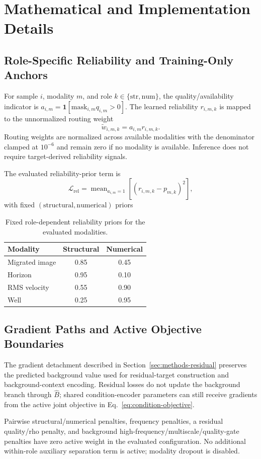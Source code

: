 \section{Mathematical and Implementation Details}
\label{app:math}
\setcounter{equation}{0}
\setcounter{table}{0}
\setcounter{figure}{0}

\subsection{Role-Specific Reliability and Training-Only Anchors}

For sample $i$, modality $m$, and role $k\in\{\mathrm{str},\mathrm{num}\}$, the quality/availability indicator is $a_{i,m}=\mathbf{1}[\mathrm{mask}_{i,m}q_{i,m}>0]$. The learned reliability $r_{i,m,k}$ is mapped to the unnormalized routing weight
\begin{equation}
\widetilde w_{i,m,k}=a_{i,m}r_{i,m,k}.
\label{eq:appendix-reliability-weight}
\end{equation}
Routing weights are normalized across available modalities with the denominator clamped at $10^{-6}$ and remain zero if no modality is available. Inference does not require target-derived reliability signals.

The evaluated reliability-prior term is
\begin{equation}
\mathcal L_{\mathrm{rel}}
=
\operatorname{mean}_{a_{i,m}=1}
\left[
(r_{i,m,k}-p_{m,k})^2
\right],
\end{equation}
with fixed $(\mathrm{structural},\mathrm{numerical})$ priors
\begin{table}[H]
\centering
\caption{Fixed role-dependent reliability priors for the evaluated modalities.}\label{tab:appendix-reliability-priors}
\begin{tabular}{lcc}
\toprule
Modality & Structural & Numerical \\
\midrule
Migrated image & 0.85 & 0.45 \\
Horizon & 0.95 & 0.10 \\
RMS velocity & 0.55 & 0.90 \\
Well & 0.25 & 0.95 \\
\bottomrule
\end{tabular}
\end{table}

\subsection{Gradient Paths and Active Objective Boundaries}

The gradient detachment described in Section~\ref{sec:methods-residual} preserves the predicted background value used for residual-target construction and background-context encoding. Residual losses do not update the background branch through $\hat B$; shared condition-encoder parameters can still receive gradients from the active joint objective in Eq.~\eqref{eq:condition-objective}.

Pairwise structural/numerical penalties, frequency penalties, a residual quality/rho penalty, and background high-frequency/multiscale/quality-gate penalties have zero active weight in the evaluated configuration. No additional within-role auxiliary separation term is active; modality dropout is disabled.
